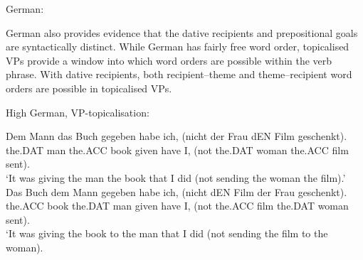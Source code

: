 \begin{exe}
	\ex German:
	\begin{xlist}
	\end{xlist}
\end{exe}

	German also provides evidence that the dative recipients and prepositional goals are syntactically distinct. While German has fairly free word order, topicalised VPs provide a window into which word orders are possible within the verb phrase. With dative recipients, both recipient--theme and theme--recipient word orders are possible in topicalised VPs.

	\begin{exe}
		\ex\label{ex:german-VP-top} High German, VP-topicalisation:
		\begin{xlist}
			\ex \gll  Dem Mann das Buch gegeben habe ich, (nicht der Frau dEN Film geschenkt).\\
			the.DAT man the.ACC book given have I, (not the.DAT woman the.ACC film sent).\\
			\trans `It was giving the man the book that I did (not sending the woman the film).'
			\ex \gll Das Buch dem Mann gegeben habe ich, (nicht dEN Film der Frau geschenkt).\\
			the.ACC book the.DAT man given have I, (not the.ACC film the.DAT woman sent).\\
			\trans `It was giving the book to the man that I did (not sending the film to the woman).\\
		\end{xlist}
	\end{exe}

